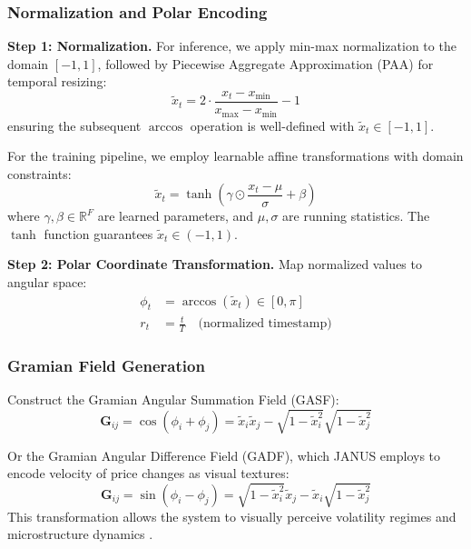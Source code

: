 \documentclass[12pt, a4paper]{article}
\begin{document}
\subsubsection{Normalization and Polar Encoding}

\textbf{Step 1: Normalization.}
For inference, we apply min-max normalization to the domain $[-1, 1]$, followed by Piecewise Aggregate Approximation (PAA) for temporal resizing:
\begin{equation}
	\tilde{x}_t = 2 \cdot \frac{x_t - x_{\min}}{x_{\max} - x_{\min}} - 1
\end{equation}
ensuring the subsequent $\arccos$ operation is well-defined with $\tilde{x}_t \in [-1, 1]$.

For the training pipeline, we employ learnable affine transformations with domain constraints:
\begin{equation}
	\tilde{x}_t = \tanh\left(\gamma \odot \frac{x_t - \mu}{\sigma} + \beta\right)
\end{equation}
where $\gamma, \beta \in \mathbb{R}^F$ are learned parameters, and $\mu, \sigma$ are running statistics. The $\tanh$ function guarantees $\tilde{x}_t \in (-1, 1)$.

\textbf{Step 2: Polar Coordinate Transformation.}
Map normalized values to angular space:
\begin{align}
	\phi_t & = \arccos(\tilde{x}_t) \in [0, \pi]               \\
	r_t    & = \frac{t}{T} \quad \text{(normalized timestamp)}
\end{align}

\subsubsection{Gramian Field Generation}

Construct the Gramian Angular Summation Field (GASF):
\begin{equation}
	\mathbf{G}_{ij} = \cos(\phi_i + \phi_j) = \tilde{x}_i \tilde{x}_j - \sqrt{1-\tilde{x}_i^2}\sqrt{1-\tilde{x}_j^2}
\end{equation}

Or the Gramian Angular Difference Field (GADF), which JANUS employs to encode velocity of price changes as visual textures:
\begin{equation}
	\mathbf{G}_{ij} = \sin(\phi_i - \phi_j) = \sqrt{1-\tilde{x}_i^2}\tilde{x}_j - \tilde{x}_i\sqrt{1-\tilde{x}_j^2}
\end{equation}
This transformation allows the system to visually perceive volatility regimes and microstructure dynamics \citep{wang2015imaging}.
\end{document}
